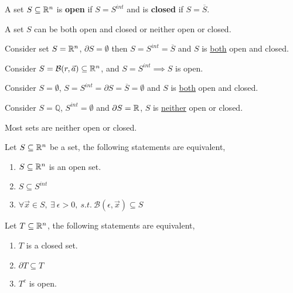 \documentclass[]{article}
\newcommand{\ball}[2]{\mathcal{B}({#1}, {#2})}
\begin{document}
	\begin{definition}
		A set $S \subseteq \mathbb{R}^n$ is \textbf{open} if $S = S^{int}$ and is \textbf{closed} if $S = \overline{S}$.
	\end{definition}
	
	\begin{remark}
		A set $S$ can be both open and closed or neither open or closed.
	\end{remark}
	
	\begin{example}
		Consider set $S = \mathbb{R}^n$, $\partial S = \emptyset$ then $S = S^{int} = \overline{S}$ and $S$ is \ul{both} open and closed.
	\end{example}
	
	\begin{example}
		Consider $S = \ball{r}{\vec{a}} \subseteq \R^n$, and $S = S^{int} \implies S$ is open.
	\end{example}
	
	\begin{example}
		Consider $S = \emptyset$, $S = S^{int} = \partial S = \overline{S} = \emptyset$ and $S$ is \ul{both} open and closed.
	\end{example}
	
	\begin{example}
		Consider $S = \mathbb{Q}$, $S^{int} = \emptyset$ and $\partial S = \mathbb{R}$, $S$ is \ul{neither} open or closed.
	\end{example}
	
	\begin{remark}
		Most sets are neither open or closed.
	\end{remark}
	
	\begin{theorem}
		Let $S\subseteq \mathbb{R}^n$ be a set, the following statements are equivalent,
		\begin{enumerate}
			\item $S \subseteq \mathbb{R}^n$ is an open set.
			\item $S \subseteq S^{int}$
			\item $\forall \vec{x} \in S,\ \exists\ \epsilon > 0,\ s.t.\ \ball{\epsilon}{\vec{x}} \subseteq S$
		\end{enumerate}
	\end{theorem}
	
	\begin{theorem}
		Let $T \subseteq \mathbb{R}^n$, the following statements are equivalent,
		\begin{enumerate}
			\item $T$ is a closed set.
			\item $\partial T \subseteq T$
			\item $T^c$ is open.
		\end{enumerate}
	\end{theorem}
	
\end{document}
